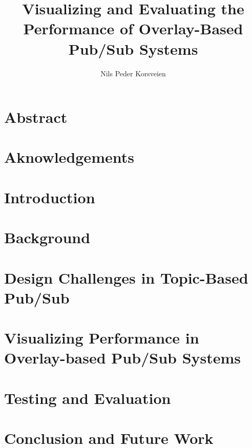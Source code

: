 \documentclass[UKenglish, a4paper]{ifimaster}
\title{Visualizing and Evaluating the Performance of Overlay-Based Pub/Sub Systems}
\subtitle{}
\author{Nils Peder Korsveien}
\begin{document}
\ififorside{}
\frontmatter{}
\maketitle{}

\chapter*{Abstract}
\tableofcontents{}
\listoffigures{}
\listoftables{}
\chapter*{Aknowledgements}
\mainmatter{}

\chapter{Introduction}


\chapter{Background}
\label{ch:background}


\chapter{Design Challenges in Topic-Based Pub/Sub}
\label{ch:design-challenges}


\chapter{Visualizing Performance in Overlay-based Pub/Sub Systems}
\label{ch:vizpub}


\chapter{Testing and Evaluation}
\label{ch:evaluation}


\chapter{Conclusion and Future Work}
\label{ch:conclusion}


\backmatter{}
\printbibliography{}
\end{document}
